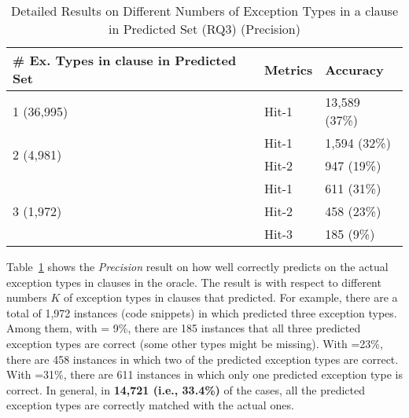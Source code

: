 \begin{table}[t]
  \caption{Detailed Results on Different Numbers of Exception Types in a  clause in Predicted Set (RQ3) (Precision)}
	\vspace{-12pt}
	{\small
		\begin{center}
			\renewcommand{\arraystretch}{1}
			\begin{tabular}{p{5cm}<{\centering}|p{1cm}<{\centering}|p{1.5cm}<{\centering}}
				\hline
				\# Ex. Types in \code{catch} clause in Predicted Set & Metrics & Accuracy \\
				\hline
				\multirow{1}{*}{1 (36,995)}   & Hit-1  & 13,589 (37\%) \\
				\hline
				\multirow{2}{*}{2 (4,981)}  & Hit-1   & 1,594 (32\%) \\
				& Hit-2       						& 947 (19\%) \\
				\hline
				\multirow{3}{*}{3 (1,972)}  & Hit-1    & 611 (31\%) \\
				& Hit-2         					& 458 (23\%)\\
				& Hit-3         				  	& 185 (9\%) \\
				\hline
			\end{tabular}
			\label{tab:precision-3}
		\end{center}
	}
\end{table}

Table~\ref{tab:precision-3} shows the {\em Precision} result on how
well {\tool} correctly predicts on the actual exception types in
 clauses in the oracle. The result is with respect to
different numbers $K$ of exception types in  clauses that
{\tool} predicted. For example, there are a total of 1,972 instances
(code snippets) in which {\tool} predicted three exception types.
Among them, with  = 9\%, there are 185 instances that all
three predicted exception types are correct (some other types might be
missing). With =23\%, there are 458 instances in which two
of the predicted exception types are correct. With =31\%,
there are 611 instances in which only one predicted exception type is
correct. In general, in {\bf 14,721 (i.e., 33.4\%)} of the cases, all
the predicted exception types are correctly matched with the actual
ones.


